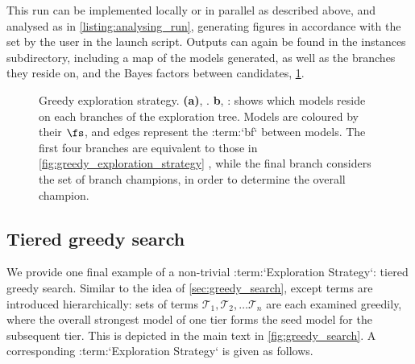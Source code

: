 This run can be implemented locally or in parallel as described above\footnotemark,
    and analysed as in \cref{listing:analysing_run},
    generating figures in accordance with the  set by the user in the launch script. 
Outputs can again be found in the instances subdirectory, including a map of the models generated, 
    as well as the branches they reside on, and the Bayes factors between candidates, \cref{fig:example_es_greedy}. 

\begin{figure}[H]
    \begin{center}
    \qquad
    \end{center}
    \caption[Greedy exploration strategy]{
        Greedy exploration strategy. 
        \textbf{(a)}, . 
        \textbf{b}, : shows which models reside on each branches of the exploration tree. 
        Models are coloured by their $\fs$, and edges represent the :term:`bf` between models. 
        The first four branches are equivalent to those in \cref{fig:greedy_exploration_strategy} ,
        while the final branch considers the set of branch champions, in order to determine the overall champion. 
    }
    \label{fig:example_es_greedy}
\end{figure}


\subsection{Tiered greedy search}
We provide one final example of a non-trivial :term:`Exploration Strategy`: 
    tiered greedy search. 
Similar to the idea of \cref{sec:greedy_search}, 
    except terms are introduced hierarchically:
    sets of terms $\mathcal{T}_1, \mathcal{T}_2, \dots \mathcal{T}_n$ 
    are each examined greedily, where the overall strongest model of one tier 
    forms the seed model for the subsequent tier. 
This is depicted in the main text in \cref{fig:greedy_search}. 
A corresponding :term:`Exploration Strategy` is given as follows. 

